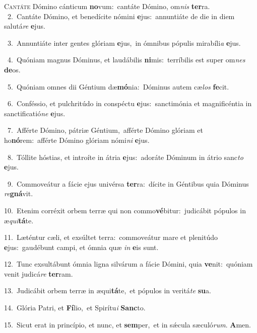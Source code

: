 \lettrine{\initial\textcolor{\initialcolor}{C}}{antáte} Dómino cánticum \textbf{no}\-vum:~\star cantáte Dómino, om\textit{nis} \textbf{ter}\-ra.\\
{\numbfont\textcolor{\numbcolor}{~2.}}~Cantáte Dómino, et benedícite nómini \textbf{e}\-jus:~\star annuntiáte de die in diem salutá\textit{re} \textbf{e}\-jus.\par
{\numbfont\textcolor{\numbcolor}{~3.}}~Annuntiáte inter gentes glóriam \textbf{e}\-jus,~\star in ómnibus pópulis mirabíli\textit{a} \textbf{e}\-jus.\par
{\numbfont\textcolor{\numbcolor}{~4.}}~Quóniam magnus Dóminus, et laudábilis \textbf{ni}\-mis:~\star terríbilis est super om\textit{nes} \textbf{de}\-os.\par
{\numbfont\textcolor{\numbcolor}{~5.}}~Quóniam omnes dii Géntium dæ\-\textbf{mó}\-nia:~\star Dóminus autem cæ\textit{los} \textbf{fe}\-cit.\par
{\numbfont\textcolor{\numbcolor}{~6.}}~Conféssio, et pulchritúdo in conspéctu \textbf{e}\-jus:~\star sanctimónia et magnificéntia in sanctificatió\textit{ne} \textbf{e}\-jus.\par
{\numbfont\textcolor{\numbcolor}{~7.}}~Afférte Dómino, pátriæ Géntium,~\dagger afférte Dómino glóriam et ho\-\textbf{nó}\-rem:~\star afférte Dómino glóriam nómi\textit{ni} \textbf{e}\-jus.\par
{\numbfont\textcolor{\numbcolor}{~8.}}~Tóllite hóstias, et introíte in átria \textbf{e}\-jus:~\star adoráte Dóminum in átrio sanc\textit{to} \textbf{e}\-jus.\par
{\numbfont\textcolor{\numbcolor}{~9.}}~Commoveátur a fácie ejus univérsa \textbf{ter}\-ra:~\star dícite in Géntibus quia Dóminus \textit{re}\-\textbf{gná}vit.\par
{\numbfont\textcolor{\numbcolor}{10.}}~Etenim corréxit orbem terræ qui non commo\-\textbf{vé}\-bitur:~\star judicábit pópulos in æ\-\textit{qui}\-\textbf{tá}te.\par
{\numbfont\textcolor{\numbcolor}{11.}}~Læténtur cæli, et exsúltet terra:~\dagger commoveátur mare et plenitúdo \textbf{e}\-jus:~\star gaudébunt campi, et ómnia quæ \textit{in} \textbf{e}\-is sunt.\par
{\numbfont\textcolor{\numbcolor}{12.}}~Tunc exsultábunt ómnia ligna silvárum a fácie Dómini, quia \textbf{ve}\-nit:~\star quóniam venit judicá\textit{re} \textbf{ter}\-ram.\par
{\numbfont\textcolor{\numbcolor}{13.}}~Judicábit orbem terræ in æqui\-\textbf{tá}\-te,~\star et pópulos in veritá\textit{te} \textbf{su}\-a.\par
{\numbfont\textcolor{\numbcolor}{14.}}~Glória Patri, et \textbf{Fí}\-lio,~\star et Spirítu\textit{i} \textbf{Sanc}\-to.\par
{\numbfont\textcolor{\numbcolor}{15.}}~Sicut erat in princípio, et nunc, et \textbf{sem}\-per,~\star et in sǽcula sæculó\-\textit{rum}\-. \textbf{A}\-men.\par
